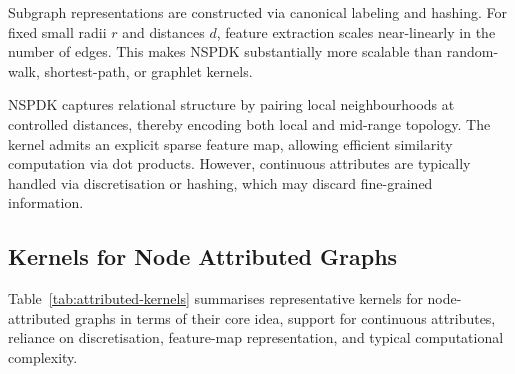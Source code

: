 Subgraph representations are constructed via
canonical labeling and hashing.
For fixed small radii $r$ and distances $d$,
feature extraction scales near-linearly in the number
of edges.
This makes NSPDK substantially more scalable than
random-walk, shortest-path, or graphlet kernels.

NSPDK captures relational structure by pairing
local neighbourhoods at controlled distances,
thereby encoding both local and mid-range topology.
The kernel admits an explicit sparse feature map,
allowing efficient similarity computation via
dot products.
However, continuous attributes are typically
handled via discretisation or hashing,
which may discard fine-grained information.



\subsection{Kernels for Node Attributed Graphs}

Table~\ref{tab:attributed-kernels} summarises representative kernels for
node-attributed graphs in terms of their core idea, support for continuous
attributes, reliance on discretisation, feature-map representation, and typical
computational complexity.

\begin{table}[h]
\centering
\caption{Overview of representative kernels for node-attributed graphs.}
\label{tab:attributed-kernels}
\end{table}

